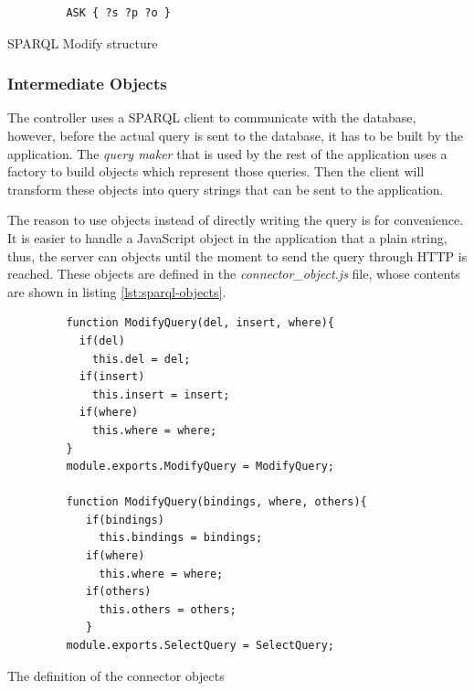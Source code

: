 \begin{description}
\begin{listing}[ht]\centering
  \begin{minipage}{.6\textwidth}
    \begin{verbatim}
	     ASK { ?s ?p ?o }
    \end{verbatim}
  \end{minipage}
  \caption{SPARQL Modify structure}\label{lst:sparql-ask}
\end{listing}
\end{description}

\subsubsection*{Intermediate Objects}

The controller uses a SPARQL client to communicate with the database, however, before the actual query is sent to the database, it has to be built by the application. The \textit{query maker} that is used by the rest of the application uses a factory to build objects which represent those queries. Then the client will transform these objects into query strings that can be sent to the application.

The reason to use objects instead of directly writing the query is for convenience. It is easier to handle a JavaScript object in the application that a plain string, thus, the server can objects until the moment to send the query through HTTP is reached. These objects are defined in the \textit{connector\_object.js} file, whose contents are shown in listing \ref{lst:sparql-objects}.

\begin{listing}[ht]\centering
  \begin{minipage}{.6\textwidth}
    \begin{verbatim}
	     function ModifyQuery(del, insert, where){
	       if(del)
	         this.del = del;
	       if(insert)
	         this.insert = insert;
	       if(where)
	         this.where = where;
	     }
	     module.exports.ModifyQuery = ModifyQuery;
	     
	     function ModifyQuery(bindings, where, others){
	     	if(bindings)
	     	  this.bindings = bindings;
	     	if(where)
	     	  this.where = where;
	     	if(others)
	     	  this.others = others;
	     	}
	     module.exports.SelectQuery = SelectQuery;
    \end{verbatim}
  \end{minipage}
  \caption{The definition of the connector objects}\label{lst:sparql-objects}
\end{listing}

